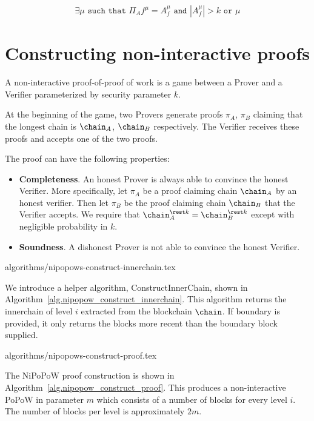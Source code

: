 \documentclass[11pt]{llncs}
\begin{document}
\begin{equation*}
    \exists \mu \texttt{ such that } \Pi_{A}{f}^{\mu} = A_f^{\mu}
    \texttt{ and }
    |A_f^{\mu}| > k
    \texttt{ or } \mu
\end{equation*}

\section{Constructing non-interactive proofs}

A non-interactive proof-of-proof of work is a game between a Prover and a
Verifier parameterized by security parameter $k$.

At the beginning of the game, two Provers generate proofs $\pi_A$, $\pi_B$
claiming that the longest chain is $\chain_A$, $\chain_B$ respectively. The
Verifier receives these proofs and accepts one of the two proofs.

The proof can have the following properties:

\begin{itemize}
    \item \textbf{Completeness}. An honest Prover is always able to convince
        the honest Verifier. More specifically, let $\pi_A$ be a proof claiming
        chain $\chain_A$ by an honest verifier. Then let $\pi_B$ be the proof
        claiming chain $\chain_B$ that the Verifier accepts. We require that
        $\chain_A^{\rest k} = \chain_B^{\rest k}$ except with negligible
        probability in $k$.

    \item \textbf{Soundness}. A dishonest Prover is not able to convince the
        honest Verifier.
\end{itemize}

{algorithms/nipopows-construct-innerchain.tex}

We introduce a helper algorithm, ConstructInnerChain, shown in
Algorithm~\ref{alg.nipopow_construct_innerchain}. This algorithm returns the innerchain
of level $i$ extracted from the blockchain $\chain$. If boundary is provided,
it only returns the blocks more recent than the boundary block supplied.

{algorithms/nipopows-construct-proof.tex}

The NiPoPoW proof construction is shown in Algorithm~\ref{alg.nipopow_construct_proof}.
This produces a non-interactive PoPoW in parameter $m$ which consists of a
number of blocks for every level $i$. The number of blocks per level is
approximately $2m$.
\end{document}
